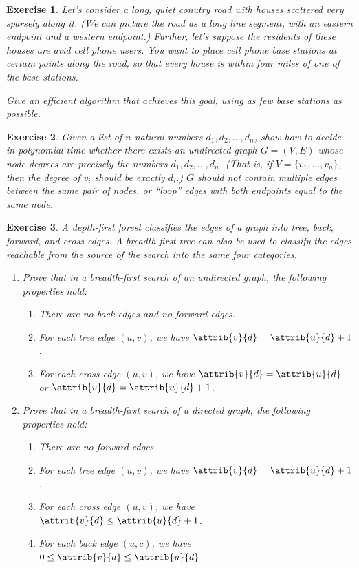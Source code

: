 \documentclass[11pt]{amsart}
\theoremstyle{theorem}
\newtheorem{exercise}{Exercise}
\begin{document}
\begin{exercise}
Let's consider a long, quiet conutry road with houses scattered very sparsely along it. (We can picture the road as a long line segment, with an eastern endpoint and a western endpoint.) Further, let's suppose the residents of these houses are avid cell phone users. You want to place cell phone base stations at certain points along the road, so that every house is within four miles of one of the base stations.

Give an efficient algorithm that achieves this goal, using as few base stations as possible.
\end{exercise}


\begin{exercise}
Given a list of $n$ natural numbers $d_1,d_2,\ldots,d_n$, show how to decide in polynomial time whether there exists an undirected graph $G=(V,E)$ whose node degrees are precisely the numbers $d_1,d_2,\ldots,d_n$. (That is, if $V=\{v_1,\ldots,v_n\}$, then the degree of $v_i$ should be exactly $d_i$.) $G$ should not contain multiple edges between the same pair of nodes, or ``loop'' edges with both endpoints equal to the same node.
\end{exercise}

\begin{exercise}
A depth-first forest classifies the edges of a graph into tree, back, forward, and cross edges. A breadth-first tree can also be used to classify the edges reachable from the source of the search into the same four categories.
\begin{enumerate}
\item Prove that in a breadth-first search of an undirected graph, the following properties hold:
\begin{enumerate}
\item There are no back edges and no forward edges.
\item For each tree edge $(u,v)$, we have $\attrib{v}{d}=\attrib{u}{d}+1$.
\item For each cross edge $(u,v)$, we have $\attrib{v}{d}=\attrib{u}{d}$ or $\attrib{v}{d}=\attrib{u}{d}+1$.
\end{enumerate}
\item Prove that in a breadth-first search of a directed graph, the following properties hold:
\begin{enumerate}
\item There are no forward edges.
\item For each tree edge $(u,v)$, we have $\attrib{v}{d}=\attrib{u}{d}+1$.
\item For each cross edge $(u,v)$, we have $\attrib{v}{d}\leq\attrib{u}{d}+1$.
\item For each back edge $(u,c)$, we have $0\leq \attrib{v}{d}\leq\attrib{u}{d}$.
\end{enumerate}
\end{enumerate}
\end{exercise}
\end{document}
